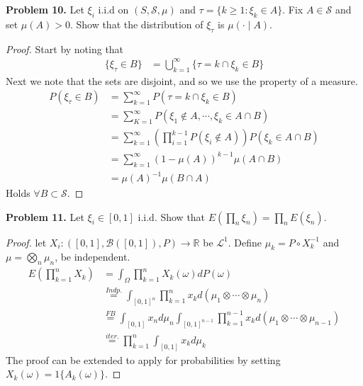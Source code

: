 \documentclass[11pt]{article}
\begin{document}
\textbf{Problem 10.}
\newline
Let $\xi_i$ i.i.d on $(S, \mathcal{S}, \mu)$ and $\tau = \{ k \geq 1 : \xi_k \in A \}$. Fix $A \in \mathcal{S}$ and set $\mu(A)>0$. 
\newline 
Show that the distribution of $\xi_\tau$ is $\mu(\cdot \mid A)$. 
\newline 
\begin{proof}
\newline
Start by noting that 
	\begin{align}
		\{\xi_\tau \in B \} &= \bigcup_{k=1}^\infty \{\tau = k \cap \xi_k \in B\}
	\end{align}
Next we note that the sets are disjoint, and so we use the property of a measure. 
	\begin{align}
		P(\xi_\tau \in B ) &= \sum_{k=1}^\infty P(\tau = k \cap \xi_k \in B) \\
		&= \sum_{K=1}^\infty P(\xi_1 \notin A, \cdots, \xi_k \in A \cap B) \\
		&= \sum_{k=1}^\infty \left( \prod_{i=1}^{k-1} P(\xi_i \notin A) \right) P(\xi_k \in A \cap B)\\
		&= \sum_{k=1}^\infty (1- \mu(A))^{k-1} \mu(A\cap B) \\
		&= \mu(A)^{-1}\mu(B \cap A)
	\end{align}
	Holds $\forall B \subset \mathcal{S}$.

\end{proof}

\textbf{Problem 11.}
\newline 
Let $\xi_i \in [0,1]$ i.i.d. Show that $E\left(\prod_n \xi_n\right) = \prod_n E(\xi_n)$.
\newline
\begin{proof}
\newline
	let $X_i: ([0,1], \mathcal{B}([0,1]), P) \rightarrow \mathbb{R}$ be $\mathcal{L}^1$.
	Define $\mu_k = P \circ X_k^{-1}$ and $\mu = \bigotimes_n \mu_n$, be independent.
	\begin{align}
		E\left( \prod_{k=1}^n X_k\right) &= \int_\Omega \prod_{k=1}^n X_k(\omega)dP(\omega) \\
		&\overset{Indp.}{=} \int_{[0,1]^n} \prod_{k=1}^n x_k d(\mu_1 \otimes \cdots \otimes \mu_n) \\
		&\overset{FB}{=} \int_{[0,1]} x_n d\mu_n \int_{[0,1]^{n-1}} \prod_{k=1}^{n-1} x_k d(\mu_1 \otimes \cdots \otimes \mu_{n-1}) \\
		&\overset{iter.}{=} \prod_{k=1}^n \int_{[0,1]} x_k d\mu_k
	\end{align}
\newline
	The proof can be extended to apply for probabilities by setting $X_k(\omega) = 1\{A_k(\omega)\}$.
\end{proof}
\end{document}
